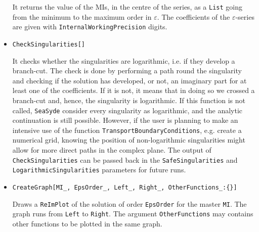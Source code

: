 \documentclass[final,1p,times]{elsarticle}
\begin{document}
\begin{itemize}
    It returns the value of the MIs, in the centre of the series, as a \texttt{List} going from the minimum to the maximum order in $\varepsilon$. The coefficients of the $\varepsilon$-series are given with \texttt{InternalWorkingPrecision} digits.
    
    \item \texttt{CheckSingularities[]}
    
    It checks whether the singularities are logarithmic, i.e. if they develop a branch-cut. The check is done by performing a path round the singularity and checking if the solution has developed, or not, an imaginary part for at least one of the coefficients. If it is not, it means that in doing so we crossed a branch-cut and, hence, the singularity is logarithmic. If this function is not called, \texttt{SeaSyde} consider every singularity as logarithmic, and the analytic continuation is still possible. However, if the user is planning to make an intensive use of the function \texttt{TransportBoundaryConditions}, e.g. create a numerical grid, knowing the position of non-logarithmic singularities might allow for more direct paths in the complex plane. The output of \texttt{CheckSingularities} can be passed back in the \texttt{SafeSingularities} and \texttt{LogarithmicSingularities} parameters for future runs.
    
    
    
    
    
    
    \item {\texttt{CreateGraph[MI\_, EpsOrder\_, Left\_, Right\_, OtherFunctions\_:\{\}]}}
    
    Draws a \texttt{ReImPlot} of the solution of order \texttt{EpsOrder} for the master \texttt{MI}. The graph runs from \texttt{Left} to \texttt{Right}. 
    The argument \texttt{OtherFunctions} may contains other functions to be plotted in the same graph.
\end{itemize}
\end{document}

